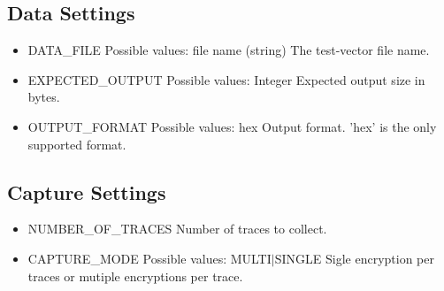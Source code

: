 \subsection{Data Settings}
\begin{itemize}
 \item DATA\_FILE \newline
 Possible values: file name (string) \newline
 The test-vector file name.
 \item EXPECTED\_OUTPUT \newline
 Possible values: Integer \newline
 Expected output size in bytes.
 \item OUTPUT\_FORMAT \newline
 Possible values: hex \newline
 Output format. 'hex' is the only supported format.
\end{itemize}

\subsection{Capture Settings}
\begin{itemize}
  \item NUMBER\_OF\_TRACES \newline
 Number of traces to collect.
 \item CAPTURE\_MODE  \newline
 Possible values: MULTI$|$SINGLE \newline
 Sigle encryption per traces or mutiple encryptions per trace.
\end{itemize}

